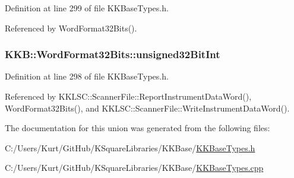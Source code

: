 Definition at line 299 of file K\+K\+Base\+Types.\+h.



Referenced by Word\+Format32\+Bits().

\subsubsection[{\texorpdfstring{unsigned32\+Bit\+Int}{unsigned32BitInt}}]{ K\+K\+B\+::\+Word\+Format32\+Bits\+::unsigned32\+Bit\+Int}\hypertarget{union_k_k_b_1_1_word_format32_bits_ac0c992b584e5b3549cd2c0e8528c9b74}{}\label{union_k_k_b_1_1_word_format32_bits_ac0c992b584e5b3549cd2c0e8528c9b74}


Definition at line 298 of file K\+K\+Base\+Types.\+h.



Referenced by K\+K\+L\+S\+C\+::\+Scanner\+File\+::\+Report\+Instrument\+Data\+Word(), Word\+Format32\+Bits(), and K\+K\+L\+S\+C\+::\+Scanner\+File\+::\+Write\+Instrument\+Data\+Word().



The documentation for this union was generated from the following files\+:\begin{DoxyCompactItemize}
\item 
C\+:/\+Users/\+Kurt/\+Git\+Hub/\+K\+Square\+Libraries/\+K\+K\+Base/\hyperlink{_k_k_base_types_8h}{K\+K\+Base\+Types.\+h}\item 
C\+:/\+Users/\+Kurt/\+Git\+Hub/\+K\+Square\+Libraries/\+K\+K\+Base/\hyperlink{_k_k_base_types_8cpp}{K\+K\+Base\+Types.\+cpp}\end{DoxyCompactItemize}

